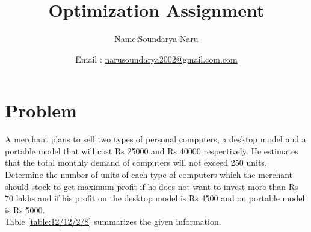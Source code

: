 \documentclass[10pt, a4paper]{article}
\begin{document}
\title{Optimization Assignment}
\author{Name:Soundarya Naru\and Email :  \url{narusoundarya2002@gmail.com.com}}
\date{}
\maketitle
  \section{Problem}
  \fi
A merchant plans to sell two types
of personal computers,  a desktop model and a portable
model that will cost Rs 25000 and Rs 40000 respectively. He
estimates that the total monthly demand of computers will
not exceed 250 units. Determine the number of units of each
type of computers which the merchant should stock to get
maximum profit if he does not want to invest more than Rs
70 lakhs and if his profit on the desktop model is Rs 4500
and on portable model is Rs 5000.
\\
\solution
		Table \ref{table:12/12/2/8} summarizes the given information.
\iffalse
\end{document}
